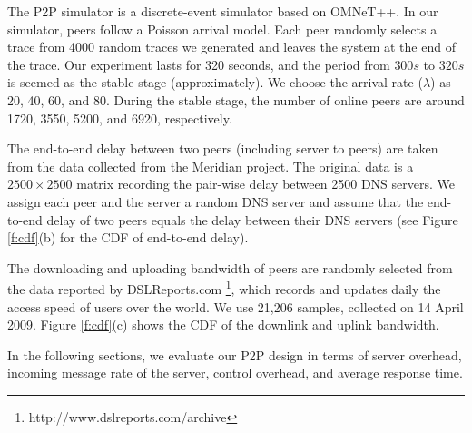     The P2P simulator is a discrete-event simulator based on 
    OMNeT++.  In our simulator, peers follow a Poisson arrival 
    model.  Each peer randomly selects a trace from 4000 random 
    traces we generated and leaves the system at the end of the trace. 
    Our experiment lasts for 320 seconds, and the period from $300s$
    to $320s$ is seemed as the stable stage (approximately).
    We choose the arrival rate ($\lambda$) as 20, 40, 60, and 80. 
    During the stable stage, the number of online peers are around 1720, 3550,
    5200, and 6920, respectively.




    The end-to-end delay between two peers (including server to peers)
    are taken from the data collected from the Meridian
    \cite{meridian:wong}
    project. The original data is a $2500 \times 2500$ matrix
    recording the pair-wise delay between 2500 DNS servers. We assign
    each peer and the server a random DNS server and assume that the
    end-to-end delay of two peers equals the delay between their DNS servers
    (see Figure \ref{f:cdf}(b) for the CDF of end-to-end delay).

    The downloading and uploading bandwidth of peers are randomly
    selected from the data reported by DSLReports.com
    \footnote{http://www.dslreports.com/archive}, which records 
    and updates daily the
    access speed of users over the world. We use 21,206 samples, 
    collected on 14 April 2009.
    Figure \ref{f:cdf}(c) shows the CDF of the downlink and uplink
    bandwidth.

    In the following sections, we evaluate our P2P design in terms of
    server overhead, 
    incoming message rate of the server, 
    control overhead, and average response time.
    

